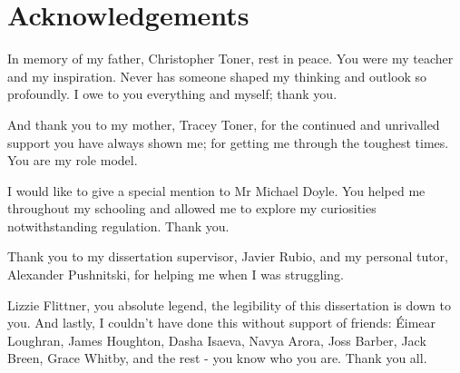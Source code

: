 \section*{Acknowledgements}

In memory of my father, Christopher Toner, rest in peace. You were my teacher and my inspiration. Never has someone shaped my thinking and outlook so profoundly. I owe to you everything and myself; thank you.

And thank you to my mother, Tracey Toner, for the continued and unrivalled support you have always shown me; for getting me through the toughest times. You are my role model.

I would like to give a special mention to Mr Michael Doyle. You helped me throughout my schooling and allowed me to explore my curiosities notwithstanding regulation. Thank you.

Thank you to my dissertation supervisor, Javier Rubio, and my personal tutor, Alexander Pushnitski, for helping me when I was struggling. 

Lizzie Flittner, you absolute legend, the legibility of this dissertation is down to you. And lastly, I couldn't have done this without support of friends: \'Eimear Loughran, James Houghton, Dasha Isaeva, Navya Arora, Joss Barber, Jack Breen, Grace Whitby, and the rest - you know who you are. Thank you all.